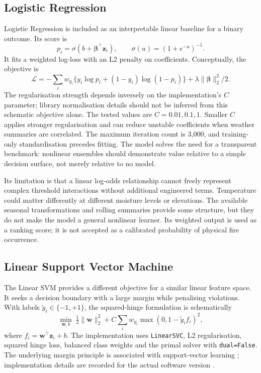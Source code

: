 \documentclass[conference,a4paper]{IEEEtran}
\begin{document}
\subsection{Logistic Regression}
Logistic Regression is included as an interpretable linear baseline for a binary outcome. Its score is
\begin{equation}
p_i=\sigma(b+\boldsymbol\beta^{\top}\mathbf z_i),\qquad
\sigma(u)=(1+e^{-u})^{-1}.
\end{equation}
It fits a weighted log-loss with an L2 penalty on coefficients. Conceptually, the objective is
\begin{equation}
\mathcal L=-\sum_i w_{y_i}\{y_i\log p_i+(1-y_i)\log(1-p_i)\}
+\lambda\|\boldsymbol\beta\|_2^2/2.
\end{equation}
The regularisation strength depends inversely on the implementation's $C$ parameter; library normalisation details should not be inferred from this schematic objective alone. The tested values are $C=0.01,0.1,1$. Smaller $C$ applies stronger regularisation and can reduce unstable coefficients when weather summaries are correlated. The maximum iteration count is 3,000, and training-only standardisation precedes fitting. The model solves the need for a transparent benchmark: nonlinear ensembles should demonstrate value relative to a simple decision surface, not merely relative to no model.

Its limitation is that a linear log-odds relationship cannot freely represent complex threshold interactions without additional engineered terms. Temperature could matter differently at different moisture levels or elevations. The available seasonal transformations and rolling summaries provide some structure, but they do not make the model a general nonlinear learner. Its weighted output is used as a ranking score; it is not accepted as a calibrated probability of physical fire occurrence.

\subsection{Linear Support Vector Machine}
The Linear SVM provides a different objective for a similar linear feature space. It seeks a decision boundary with a large margin while penalising violations. With labels $\tilde y_i\in\{-1,+1\}$, the squared-hinge formulation is schematically
\begin{equation}
\min_{\mathbf w,b}\;\tfrac12\|\mathbf w\|_2^2+
C\sum_i w_{y_i}\max(0,1-\tilde y_i f_i)^2,
\end{equation}
where $f_i=\mathbf w^\top\mathbf z_i+b$. The implementation uses \texttt{LinearSVC}, L2 regularisation, squared hinge loss, balanced class weights and the primal solver with \texttt{dual=False}. The underlying margin principle is associated with support-vector learning \citep{cortes}; implementation details are recorded for the actual software version \citep{sklearnsvm}.
\end{document}
